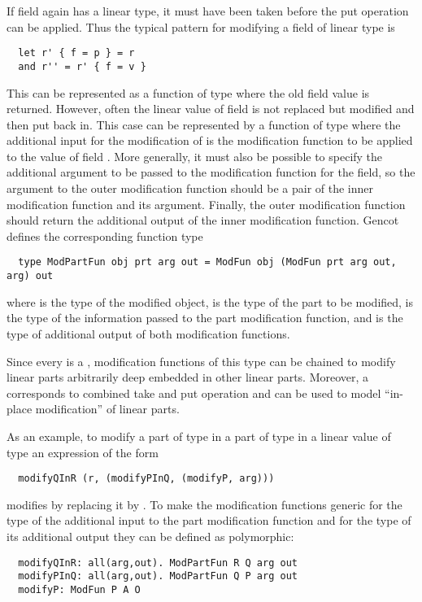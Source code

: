 If field  again has a linear type, it must have been taken before the put operation can be applied. Thus the 
typical pattern for modifying a field of linear type is
\begin{verbatim}
  let r' { f = p } = r 
  and r'' = r' { f = v }
\end{verbatim}
This can be represented as a function of type  where the old field value is returned.
However, often the linear value of field  is not replaced but modified and then put back
in. This case can be represented by a function of type  where the additional input for the modification
of  is the modification function to be applied to the value of field . More generally, it must also be possible
to specify the additional argument to be passed to the modification function for the field, so the argument to the outer 
modification function should be a pair of the inner modification function and its argument. Finally, the outer modification function
should return the additional output of the inner modification function. Gencot defines the corresponding
function type
\begin{verbatim}
  type ModPartFun obj prt arg out = ModFun obj (ModFun prt arg out, arg) out
\end{verbatim}
where  is the type of the modified object,  is the type of the part to be modified,  is the type
of the information passed to the part modification function, and  is the type of additional output of both modification functions.

Since every  is a , modification functions of this type can be chained to modify linear parts arbitrarily 
deep embedded in other linear parts. Moreover, a  corresponds to combined take and put operation and can be used
to model ``in-place modification'' of linear parts.

As an example, to modify a part  of type  in a part  of type  in a linear value  of type 
an expression of the form
\begin{verbatim}
  modifyQInR (r, (modifyPInQ, (modifyP, arg)))
\end{verbatim}
modifies  by replacing it by . To make the modification functions generic for the type of the additional input
to the part modification function and for the type of its additional output they can be defined as polymorphic:
\begin{verbatim}
  modifyQInR: all(arg,out). ModPartFun R Q arg out
  modifyPInQ: all(arg,out). ModPartFun Q P arg out
  modifyP: ModFun P A O
\end{verbatim}

